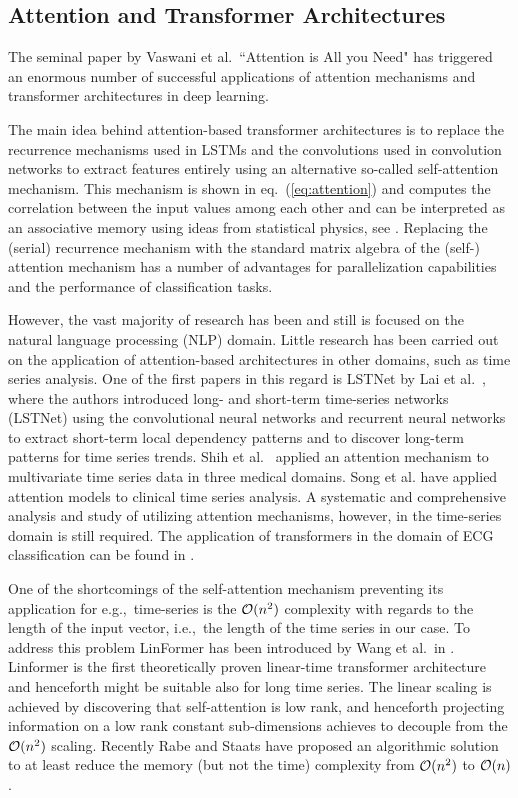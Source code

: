 \documentclass{ieeeaccess}
\begin{document}
\subsection{Attention and Transformer Architectures}
The seminal paper by Vaswani et al.~``Attention is All you Need" \cite{VaswaniEtAl} has triggered an enormous number of successful applications of attention mechanisms and transformer architectures in deep learning. 

The main idea behind attention-based transformer architectures is to replace the recurrence mechanisms used in LSTMs and the convolutions used in convolution networks to extract features entirely using an alternative so-called self-attention mechanism. This mechanism is shown in eq.\ (\ref{eq:attention}) and computes the correlation between the input values among each other and can be interpreted as an associative memory using ideas from statistical physics,  see \cite{RamsauerEtAl}. Replacing the (serial) recurrence mechanism with the standard matrix algebra of the (self-) attention mechanism has a number of advantages for parallelization capabilities and the performance of classification tasks.

However, the vast majority of research has been and still is focused on the natural language processing (NLP) domain. Little research has been carried out on the application of attention-based architectures in other domains, such as time series analysis. One of the first papers in this regard is LSTNet by Lai et al.~\cite{LaiEtAl}, where the authors introduced long- and short-term time-series networks (LSTNet) using the convolutional neural networks and  recurrent neural networks to extract short-term local dependency patterns and to discover long-term patterns for time series trends. Shih et al.~\cite{ShunYaoEtAl} applied an attention mechanism to multivariate time series data in three medical domains. Song et al.\cite{SongEtAl} have applied attention models to clinical time series analysis. A systematic and comprehensive analysis and study of utilizing attention mechanisms, however, in the time-series domain is still required. The application of transformers in the domain of ECG classification can be found in \cite{YanEtAl}.

One of the shortcomings of the self-attention mechanism preventing its application for e.g.,\ time-series is the  ${\cal O}(n^2)$ complexity with regards to the length of the input vector, i.e.,\ the length of the time series in our case. To address this problem LinFormer has been introduced by Wang et al.\ in \cite{WangEtAl}. Linformer is the first theoretically proven linear-time transformer architecture and henceforth might be suitable also for long time series. The linear scaling is achieved by discovering that self-attention is low rank, and henceforth projecting information on a low rank constant sub-dimensions achieves to decouple from the ${\cal O}(n^2)$ scaling. Recently Rabe and Staats \cite{RabeStaats} have proposed an algorithmic solution to at least reduce the memory (but not the time) complexity from  ${\cal O}(n^2)$ to  ${\cal O}(n)$.
\end{document}
